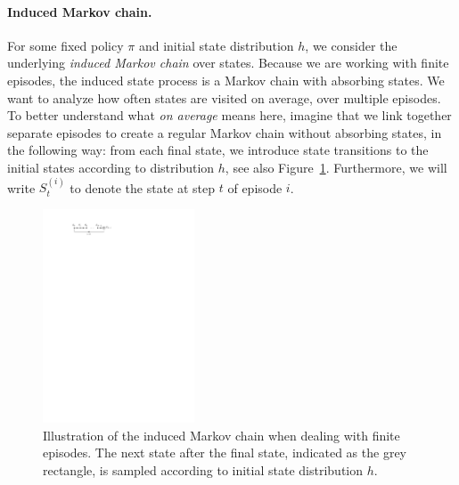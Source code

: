 \documentclass[a4paper]{report}
\theoremstyle{definition}
\theoremstyle{plain}
\begin{document}
\paragraph{Induced Markov chain.}
For some fixed policy $\pi$ and initial state distribution $h$, we consider the
underlying \textit{induced Markov chain} over states. Because we are working with finite
episodes, the induced state process is a Markov chain with absorbing states.
%
We want to analyze how often states are visited on average, over multiple episodes.
%
To better understand what \textit{on average} means here, imagine that we link
together separate episodes to create a regular Markov chain without absorbing
states, in the following way: from each final state, we introduce state
transitions to the initial states according to distribution $h$, see also
Figure~\ref{fig:episodic_MC}. Furthermore, we will write $S_{t}^{(i)}$ to denote
the state at step $t$ of episode $i$.

\begin{figure}[h]
  \centering
  \includegraphics[width=0.4\textwidth]{figures/episodic_markov_chain.pdf}
  \caption{Illustration of the induced Markov chain when dealing with finite
    episodes. The next state after the final state, indicated as the grey
    rectangle, is sampled according to initial state distribution $h$.}
  \label{fig:episodic_MC}
\end{figure}
\end{document}
